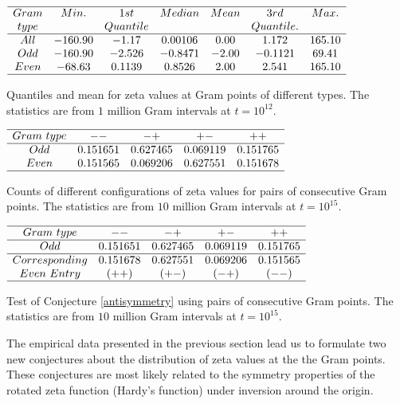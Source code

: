 \documentclass[twoside]{article}
\begin{document}
\begin{table}
\centering \(\begin{array}{ccccccc}
\hline
 Gram &     Min.   & 1st    &  Median    &   Mean   & 3rd    &   Max. \\
 type &              & Quantile   &            &              & Quantile.    &   \\
\hline
All& -160.90 &   -1.17 &    0.00106 &   0.00  &  1.172 &165.10\\
Odd&-160.90 &   -2.526 &   -0.8471  & -2.00 &   -0.1121 &  69.41 \\
Even&-68.63 &   0.1139 &  0.8526  & 2.00 &   2.541 & 165.10 \\
\hline
\end{array}\)
\caption{Quantiles and mean for zeta values at Gram points of different types.  The statistics are from $1$ million Gram intervals at $t=10^{12}$.} \label{tab:quantiles}
\end{table}


\begin{table}
\centering \(\begin{array}{ccccc}
\hline
 Gram~type&   --   & -+   & +-   & ++  \\
\hline
Odd & 0.151651&0.627465&0.069119&0.151765 \\
Even & 0.151565&0.069206&0.627551&0.151678 \\
\hline
\end{array}\)
\caption{Counts of different configurations of zeta values for pairs of consecutive Gram points.  The statistics are from $10$ million Gram intervals at $t=10^{15}$.} \label{tab:pairraw}
\end{table}

\begin{table}
\centering \(\begin{array}{ccccc}
\hline
 Gram~type&   --   & -+   & +-   & ++  \\
\hline
Odd & 0.151651&0.627465&0.069119&0.151765\\
\hline
Corresponding& 0.151678 & 0.627551 & 0.069206& 0.151565\\ 
Even~Entry     & (++)     & (+-)   & (-+)  & (--) \\
\hline
\end{array}\)
\caption{Test of Conjecture \ref{antisymmetry} using pairs of consecutive Gram points.  The statistics are from $10$ million Gram intervals at $t=10^{15}$.} \label{tab:pairtest}
\end{table}


The empirical data presented in the previous section lead us to formulate two new conjectures  about the distribution of zeta values at the 
the Gram points. These conjectures are most likely related to the symmetry properties of the rotated zeta function (Hardy's function) under inversion around the origin. 
\end{document}
